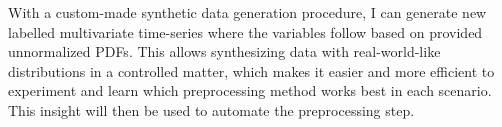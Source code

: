 \documentclass[portrait,final,x11names,a1paper,fontscale=0.40]{baposter}
\newcommand{\icl}[1]{{\bf\color{blue_icl2}{#1}}}
\begin{document}
\begin{poster}
{\noindent
With a custom-made synthetic data  generation procedure, I can generate new
labelled multivariate time-series where the variables follow \icl{arbitrary distributions} based on provided
unnormalized PDFs. This allows synthesizing data with real-world-like distributions
in a controlled matter, which makes it easier and more efficient to experiment and learn
which preprocessing method works best in each scenario. This insight will then be used to automate the
preprocessing step.




}

\end{poster}
\end{document}

